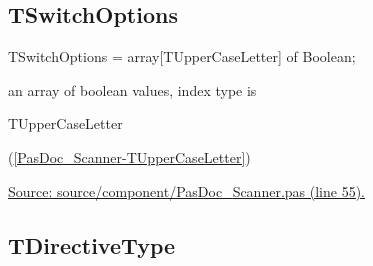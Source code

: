 \documentclass{report}
\newif\ifpdf
\begin{document}
\subsection*{TSwitchOptions}
\fi
\label{PasDoc_Scanner-TSwitchOptions}
\begin{list}{}{
\setlength{\itemindent}{0cm}
\setlength{\listparindent}{0cm}
\setlength{\leftmargin}{\evensidemargin}
\addtolength{\leftmargin}{\tmplength}
\settowidth{\labelsep}{X}
\addtolength{\leftmargin}{\labelsep}
\setlength{\labelwidth}{\tmplength}
}
\item[\textbf{Declaration}\hfill]
\ifpdf
\begin{flushleft}
\fi
\begin{ttfamily}
TSwitchOptions = array[TUpperCaseLetter] of Boolean;\end{ttfamily}

\ifpdf
\end{flushleft}
\fi

\par
\item[\textbf{Description}]
an array of boolean values, index type is \begin{ttfamily}TUpperCaseLetter\end{ttfamily}(\ref{PasDoc_Scanner-TUpperCaseLetter})\par
\href{https://github.com/pasdoc/pasdoc/blob/master/source/component/PasDoc_Scanner.pas#L55}{Source: source/component/PasDoc{\_}Scanner.pas (line 55).}

\end{list}
\ifpdf
\subsection*{\large{\textbf{TDirectiveType}}\normalsize\hspace{1ex}\hrulefill}
\else
\end{document}
